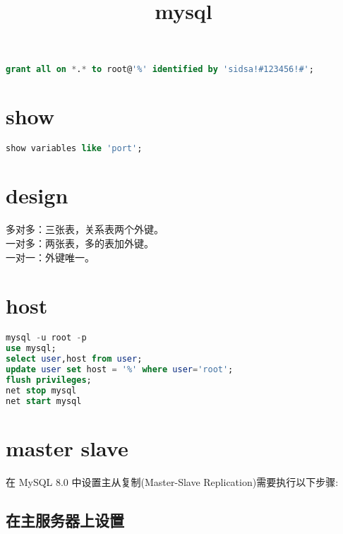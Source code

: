 \documentclass[12pt,twiside,a4paper]{book}
\numberwithin{chapter}{part}
\begin{document}
\author
{
}

\title{mysql}
\maketitle
\tableofcontents %
\newpage
\pagestyle{fancy}

\section{}
\begin{lstlisting}[language=sql,breaklines = true]
grant all on *.* to root@'%' identified by 'sidsa!#123456!#';
\end{lstlisting}

\section{show}
\begin{lstlisting}[language=sql,breaklines = true]
show variables like 'port';
\end{lstlisting}
\section{design}
多对多：三张表，关系表两个外键。\\
一对多：两张表，多的表加外键。\\
一对一：外键唯一。

\section{host}
\begin{lstlisting}[language=sql,breaklines = true]
mysql -u root -p
use mysql;
select user,host from user;
update user set host = '%' where user='root';
flush privileges;
net stop mysql
net start mysql
\end{lstlisting}

\section{master slave}
在 MySQL 8.0 中设置主从复制(Master-Slave Replication)需要执行以下步骤:\\
\subsection{在主服务器上设置}
\end{document}
